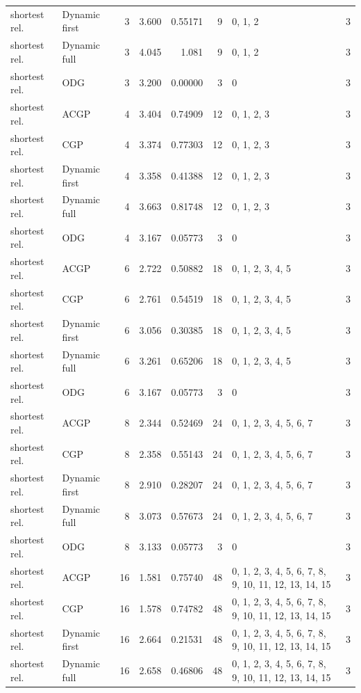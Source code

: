 \documentclass[10pt,a4paper]{article}
\begin{document}
\begin{longtable}{@{}p{23mm}p{29mm}rrrrp{36mm}r@{}}
shortest rel. & Dynamic first & 3 & 3.600 & 0.55171 & 9 & 0, 1, 2 & 3 \\
shortest rel. & Dynamic full & 3 & 4.045 & 1.081 & 9 & 0, 1, 2 & 3 \\
shortest rel. & ODG & 3 & 3.200 & 0.00000 & 3 & 0 & 3 \\
shortest rel. & ACGP & 4 & 3.404 & 0.74909 & 12 & 0, 1, 2, 3 & 3 \\
shortest rel. & CGP & 4 & 3.374 & 0.77303 & 12 & 0, 1, 2, 3 & 3 \\
shortest rel. & Dynamic first & 4 & 3.358 & 0.41388 & 12 & 0, 1, 2, 3 & 3 \\
shortest rel. & Dynamic full & 4 & 3.663 & 0.81748 & 12 & 0, 1, 2, 3 & 3 \\
shortest rel. & ODG & 4 & 3.167 & 0.05773 & 3 & 0 & 3 \\
shortest rel. & ACGP & 6 & 2.722 & 0.50882 & 18 & 0, 1, 2, 3, 4, 5 & 3 \\
shortest rel. & CGP & 6 & 2.761 & 0.54519 & 18 & 0, 1, 2, 3, 4, 5 & 3 \\
shortest rel. & Dynamic first & 6 & 3.056 & 0.30385 & 18 & 0, 1, 2, 3, 4, 5 & 3 \\
shortest rel. & Dynamic full & 6 & 3.261 & 0.65206 & 18 & 0, 1, 2, 3, 4, 5 & 3 \\
shortest rel. & ODG & 6 & 3.167 & 0.05773 & 3 & 0 & 3 \\
shortest rel. & ACGP & 8 & 2.344 & 0.52469 & 24 & 0, 1, 2, 3, 4, 5, 6, 7 & 3 \\
shortest rel. & CGP & 8 & 2.358 & 0.55143 & 24 & 0, 1, 2, 3, 4, 5, 6, 7 & 3 \\
shortest rel. & Dynamic first & 8 & 2.910 & 0.28207 & 24 & 0, 1, 2, 3, 4, 5, 6, 7 & 3 \\
shortest rel. & Dynamic full & 8 & 3.073 & 0.57673 & 24 & 0, 1, 2, 3, 4, 5, 6, 7 & 3 \\
shortest rel. & ODG & 8 & 3.133 & 0.05773 & 3 & 0 & 3 \\
shortest rel. & ACGP & 16 & 1.581 & 0.75740 & 48 & 0, 1, 2, 3, 4, 5, 6, 7, 8, 9, 10, 11, 12, 13, 14, 15 & 3 \\
shortest rel. & CGP & 16 & 1.578 & 0.74782 & 48 & 0, 1, 2, 3, 4, 5, 6, 7, 8, 9, 10, 11, 12, 13, 14, 15 & 3 \\
shortest rel. & Dynamic first & 16 & 2.664 & 0.21531 & 48 & 0, 1, 2, 3, 4, 5, 6, 7, 8, 9, 10, 11, 12, 13, 14, 15 & 3 \\
shortest rel. & Dynamic full & 16 & 2.658 & 0.46806 & 48 & 0, 1, 2, 3, 4, 5, 6, 7, 8, 9, 10, 11, 12, 13, 14, 15 & 3 \\

\end{longtable}
\end{document}
